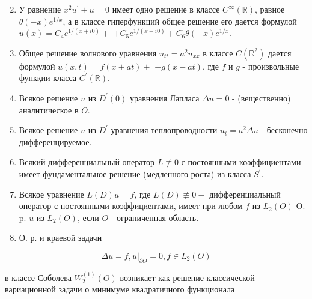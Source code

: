 \documentclass[10pt]{article}
\begin{document}
\begin{enumerate}

  \setcounter{enumi}{1}

  \item У равнение $x^{2} u^{\prime}+u=0$ имеет одно решение в классе $C^{\infty}(\mathbb{R})$, равное $\theta(-x) e^{1 / x}$, а в классе гиперфункций общее решение его дается формулой $u(x)=C_{4} e^{1 /(x+i 0)}+$ $+C_{5} e^{1 /(x-i 0)}+C_{6} \theta(-x) e^{1 / x}$.



  \item Общее решение волнового уравнения $u_{t t}=a^{2} u_{x x}$ в классе $C\left(\mathbb{R}^{2}\right)$ дается формулой $u(x, t)=f(x+a t)+$ $+g(x-a t)$, где $f$ и $g$ - произвольные функқии класса $C^{\prime}(\mathbb{R})$.



  \item Всякое решение $u$ из $D^{\prime}(0)$ уравнения Лапласа $\Delta u=0$ - (вещественно) аналитическое в $O$.



  \item Всякое решение $u$ из $D^{\prime}$ уравнения теплопроводности $u_{t}=a^{2} \Delta u$ - бесконечно дифференцируемое.



  \item Всякий дифференциальный оператор $L \not \equiv 0$ с постоянными коәффициентами имеет фундаментальное решение (медленного роста) из класса $S^{\prime}$.



  \item Всякое уравнение $L(D) u=f$, где $L(D) \not \equiv 0-$ дифференциальный оператор с постоянными коэффициентами, имеет при любом $f$ из $L_{2}(O)$ O. p. $u$ из $L_{2}(O)$, если $O$ - ограниченная область.



  \item О. р. и краевой задачи



\end{enumerate}



\[

\Delta u=f,\left.u\right|_{\partial O}=0, f \in L_{2}(O)

\]



в классе Соболева $W_{2}^{(1)}(O)$ возникает как решение классической вариационной задачи о минимуме квадратичного функционала
\end{document}
